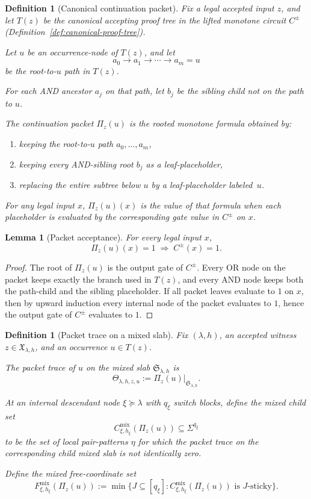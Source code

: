 \documentclass[11pt]{article}
\newtheorem{lemma}[theorem]{Lemma}
\newtheorem{definition}[theorem]{Definition}
\begin{document}
\begin{definition}[Canonical continuation packet]
\label{def:continuation-packet}
Fix a legal accepted input $z$, and let $T(z)$ be the canonical accepting
proof tree in the lifted monotone circuit $C^{\pm}$
(Definition~\ref{def:canonical-proof-tree}).

Let $u$ be an occurrence-node of $T(z)$, and let
\[
a_0\to a_1\to\cdots\to a_m=u
\]
be the root-to-$u$ path in $T(z)$.

For each AND ancestor $a_j$ on that path, let $b_j$ be the sibling child
not on the path to $u$.

The \emph{continuation packet} $\Pi_z(u)$ is the rooted monotone formula
obtained by:
\begin{enumerate}
\item keeping the root-to-$u$ path $a_0,\dots,a_m$,
\item keeping every AND-sibling root $b_j$ as a leaf-placeholder,
\item replacing the entire subtree below $u$ by a leaf-placeholder
  labeled~$u$.
\end{enumerate}

For any legal input $x$, $\Pi_z(u)(x)$ is the value of that formula when
each placeholder is evaluated by the corresponding gate value in $C^{\pm}$
on $x$.
\end{definition}

\begin{lemma}[Packet acceptance]
\label{lem:packet-acceptance}
For every legal input $x$,
\[
\Pi_z(u)(x)=1\;\Longrightarrow\;C^{\pm}(x)=1.
\]
\end{lemma}

\begin{proof}
The root of $\Pi_z(u)$ is the output gate of $C^{\pm}$.  Every OR node on
the packet keeps exactly the branch used in $T(z)$, and every AND node
keeps both the path-child and the sibling placeholder.  If all packet
leaves evaluate to $1$ on $x$, then by upward induction every internal
node of the packet evaluates to $1$, hence the output gate of $C^{\pm}$
evaluates to $1$.
\end{proof}

\begin{definition}[Packet trace on a mixed slab]
\label{def:packet-trace-mixed-slab}
Fix $(\lambda,h)$, an accepted witness $z\in\mathfrak{X}_{\lambda,h}$, and
an occurrence $u\in T(z)$.

The \emph{packet trace} of $u$ on the mixed slab $\mathfrak{S}_{\lambda,h}$
is
\[
\Theta_{\lambda,h,z,u}
:=\Pi_z(u)\big|_{\mathfrak{S}_{\lambda,h}}.
\]

At an internal descendant node $\xi\succeq\lambda$ with $q_\xi$ switch
blocks, define the \emph{mixed child set}
\[
C_{\xi,h_\xi}^{\mathrm{mix}}(\Pi_z(u))\subseteq\Sigma^{q_\xi}
\]
to be the set of local pair-patterns $\eta$ for which the packet trace on
the corresponding child mixed slab is not identically zero.

Define the \emph{mixed free-coordinate set}
\[
F_{\xi,h_\xi}^{\mathrm{mix}}(\Pi_z(u))
:=\min\bigl\{J\subseteq[q_\xi]:
C_{\xi,h_\xi}^{\mathrm{mix}}(\Pi_z(u))\text{ is }J\text{-sticky}\bigr\}.
\]
\end{definition}
\end{document}
